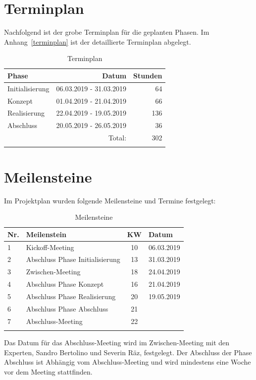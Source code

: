 
\clearpage
\section{Terminplan}

Nachfolgend ist der grobe Terminplan für die geplanten Phasen. Im Anhang~\ref{terminplan} ist
der detaillierte Terminplan abgelegt.

\begin{longtable}[]{@{}lrr@{}}
  \toprule
  Phase           & Datum                   & Stunden\tabularnewline
  \midrule
  \endhead
  Initialisierung & 06.03.2019 - 31.03.2019 & 64\tabularnewline
  Konzept         & 01.04.2019 - 21.04.2019 & 66\tabularnewline
  Realisierung    & 22.04.2019 - 19.05.2019 & 136\tabularnewline
  Abschluss       & 20.05.2019 - 26.05.2019 & 36\tabularnewline
  \midrule
                  & Total:                  & 302\tabularnewline
  \bottomrule
  \caption{Terminplan}
\end{longtable}


\section{Meilensteine}\label{meilensteine}

Im Projektplan wurden folgende Meilensteine und Termine festgelegt:

\begin{longtable}[]{@{}llcl@{}}
  \toprule
  Nr. & Meilenstein                     & KW & Datum\tabularnewline
  \midrule
  \endhead
  1   & Kickoff-Meeting                 & 10 & 06.03.2019\tabularnewline
  2   & Abschluss Phase Initialisierung & 13 & 31.03.2019\tabularnewline
  3   & Zwischen-Meeting                & 18 & 24.04.2019\tabularnewline
  4   & Abschluss Phase Konzept         & 16 & 21.04.2019\tabularnewline
  5   & Abschluss Phase Realisierung    & 20 & 19.05.2019\tabularnewline
  6   & Abschluss Phase Abschluss       & 21 & \tabularnewline
  7   & Abschluss-Meeting               & 22 & \tabularnewline
  \bottomrule
  \caption{Meilensteine}
\end{longtable}

Das Datum für das Abschluss-Meeting wird im Zwischen-Meeting mit den Experten, Sandro Bertolino und Severin Räz, festgelegt. Der Abschluss der Phase Abschluss ist Abhängig vom Abschluss-Meeting und wird mindestens eine Woche vor dem Meeting stattfinden.

